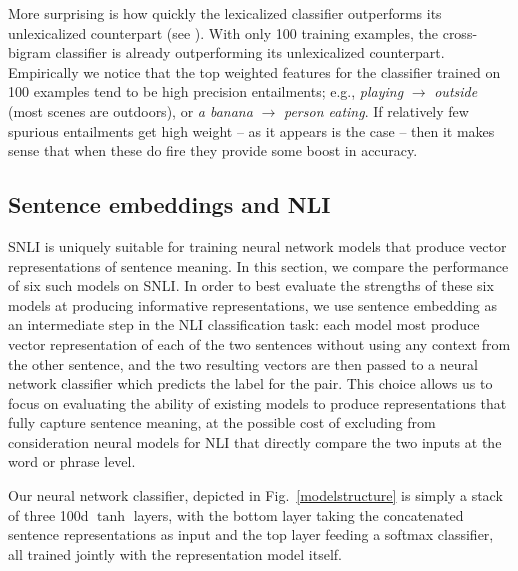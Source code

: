 More surprising is how quickly the lexicalized classifier outperforms its
  unlexicalized counterpart (see ).
With only 100 training examples, the cross-bigram classifier is already
  outperforming its unlexicalized counterpart.
Empirically we notice that the top weighted features for the classifier
  trained on 100 examples tend to be high precision entailments;
  e.g.,
  \textit{playing} $\rightarrow$ \textit{outside}
  (most scenes are outdoors), or \textit{a banana} $\rightarrow$
  \textit{person eating}.
If relatively few spurious entailments get high weight -- as it appears
  is the case -- then it makes sense that when these do fire they
  provide some boost in accuracy.



\subsection{Sentence embeddings and NLI}\label{sentence-embedding}

SNLI is uniquely suitable for training neural network models that produce vector representations of sentence meaning. In this section, we compare the performance of six such models on SNLI. 
In order to best evaluate the strengths of these six models at producing informative representations, we use sentence embedding as an intermediate step in the NLI classification task: each model most produce vector representation of each of the two sentences without using any context from the other sentence, and the two resulting vectors are then passed to a neural network classifier which predicts the label for the pair. This choice allows us to focus on evaluating the ability of existing models to produce representations that fully capture sentence meaning, at the possible cost of excluding from consideration neural models for NLI that directly compare the two inputs at the word or phrase level.



Our neural network classifier, depicted in Fig.~\ref{modelstructure} is simply a stack of three 100d $\tanh$ layers, with the bottom layer taking the concatenated sentence representations as input and the top layer feeding a softmax classifier, all trained jointly with the representation model itself.

